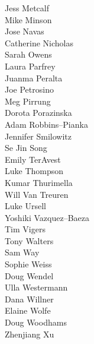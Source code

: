 \documentclass[10pt,letterpaper]{article}
\begin{document}
\parbox[t]{0.17\textwidth}{
\scriptsize{
Jess Metcalf\\
Mike Minson\\
Jose Navas\\
Catherine Nicholas\\
Sarah Owens\\
Laura Parfrey\\
Juanma Peralta\\
Joe Petrosino\\
Meg Pirrung\\
Dorota Porazinska\\
Adam Robbins--Pianka\\
Jennifer Smilowitz\\
Se Jin Song\\
Emily TerAvest\\
Luke Thompson\\
Kumar Thurimella\\
Will Van Treuren\\
Luke Ursell\\
Yoshiki Vazquez--Baeza\\
Tim Vigers\\
Tony Walters\\
Sam Way\\
Sophie Weiss\\
Doug Wendel\\
Ulla Westermann\\
Dana Willner\\
Elaine Wolfe\\
Doug Woodhams\\
Zhenjiang Xu\\
}
} %
\hspace{2mm}
\end{document}
